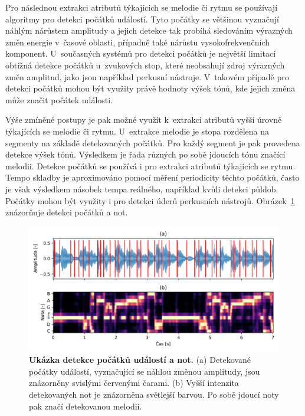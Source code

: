 Pro následnou extrakci atributů týkajících se melodie či rytmu se používají algoritmy pro detekci počátků událostí. Tyto počátky se většinou vyznačují náhlým nárůstem amplitudy a jejich detekce tak probíhá sledováním výrazných změn energie v~časové oblasti, případně také nárůstu vysokofrekvenčních komponent. U~současných systémů pro detekci počátků je největší limitací obtížná detekce počátků u~zvukových stop, které neobsahují zdroj výrazných změn amplitud, jako jsou například perkusní nástroje. V~takovém případě pro detekci počátků mohou být využity právě hodnoty výšek tónů, kde jejich změna může značit počátek události.\cite{MIR}\cite{aca}

Výše zmíněné postupy je pak možné využít k~extrakci atributů vyšší úrovně týkajících se melodie či rytmu. U~extrakce melodie je stopa rozdělena na segmenty na základě detekovaných počátků. Pro každý segment je pak provedena detekce výšek tónů. Výsledkem je řada různých po sobě jdoucích tónu značící melodii. Detekce počátků se používá i pro extrakci atributů týkajících se rytmu. Tempo skladby je aproximováno pomocí měření periodicity těchto počátků, často je však výsledkem násobek tempa reálného, například kvůli detekci půldob. Počátky mohou být využity i pro detekci úderů perkusních nástrojů. Obrázek~\ref{obr_detekce_pocatku_a_not} znázorňuje detekci počátků a not.\cite{MIR}\cite{aca}

\begin{figure}[h]
    \centering
    \includegraphics[width=\textwidth]{obrazky/detekce_pocatku_chroma.pdf}
    \caption{\textbf{Ukázka detekce počátků událostí a not.} (a) Detekované počátky událostí, vyznačující se náhlou změnou amplitudy, jsou znázorněny svislými červenými čarami. (b) Vyšší intenzita detekovaných not je znázorněna světlejší barvou. Po sobě jdoucí noty pak značí detekovanou melodii.}
    \label{obr_detekce_pocatku_a_not}
\end{figure}


